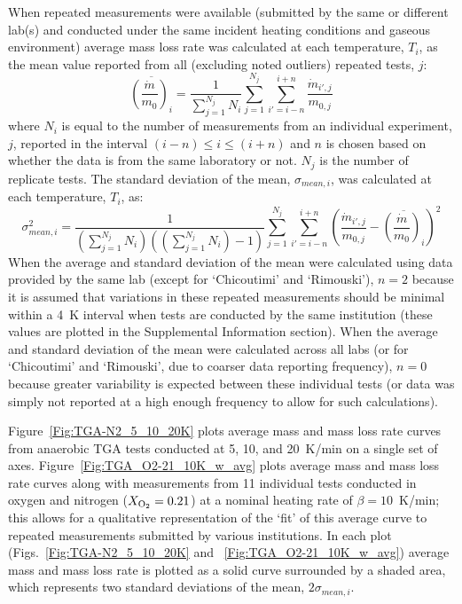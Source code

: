 \documentclass{book}
\begin{document}
When repeated measurements were available (submitted by the same or different lab(s) and conducted under the same incident heating conditions and gaseous environment) average mass loss rate was calculated at each temperature, $T_i$, as the mean value reported from all (excluding noted outliers) repeated tests, $j$:
\begin{equation}
\overline{\left(\frac{\dot{m}}{m_0}\right)_i} = \frac{1}{\sum_{j=1}^{N_j}N_i} \sum_{j=1}^{N_j} \sum_{i'=i-n}^{i+n} \frac{\dot{m}_{i',j}}{m_{0,j}}
\end{equation}
where $N_i$ is equal to the number of measurements from an individual experiment, $j$, reported in the interval $(i-n) \leq i \leq (i+n)$ and $n$ is chosen based on whether the data is from the same laboratory or not. $N_j$ is the number of replicate tests. The standard deviation of the mean,   $\sigma_{mean,i}$, was calculated at each temperature, $T_i$, as:
\begin{equation}
  \sigma_{mean,i}^2 = \frac{1}{(\sum_{j=1}^{N_j}N_i)((\sum_{j=1}^{N_j}N_i)-1)} \sum_{j=1}^{N_j} \sum_{i'=i-n}^{i+n}  \left( \frac{\dot{m}_{i',j}}{m_{0,j}} - \overline{\left(\frac{\dot{m}}{m_0}\right)_i} \right)^2
\end{equation}
When the average and standard deviation of the mean were calculated using data provided by the same lab (except for ‘Chicoutimi’ and ‘Rimouski’), $n=2$ because it is assumed that variations in these repeated measurements should be minimal within a 4~K interval when tests are conducted by the same institution (these values are plotted in the Supplemental Information section). When the average and standard deviation of the mean were calculated across all labs (or for ‘Chicoutimi’ and ‘Rimouski’, due to coarser data reporting frequency), $n=0$ because greater variability is expected between these individual tests (or data was simply not reported at a high enough frequency to allow for such calculations).

Figure~\ref{Fig:TGA-N2_5_10_20K} plots average mass and mass loss rate curves from anaerobic TGA tests conducted at 5, 10, and 20~K/min on a single set of axes. Figure~\ref{Fig:TGA_O2-21_10K_w_avg} plots average mass and mass loss rate curves along with measurements from 11 individual tests conducted in oxygen and nitrogen ($X_{\rm O_2}=0.21$) at a nominal heating rate of $\beta=10$~K/min; this allows for a qualitative representation of the ‘fit’ of this average curve to repeated measurements submitted by various institutions. In each plot (Figs.~\ref{Fig:TGA-N2_5_10_20K} and ~\ref{Fig:TGA_O2-21_10K_w_avg}) average mass and mass loss rate is plotted as a solid curve surrounded by a shaded area, which represents two standard deviations of the mean, $2 \sigma_{mean,i}$.
\end{document}
